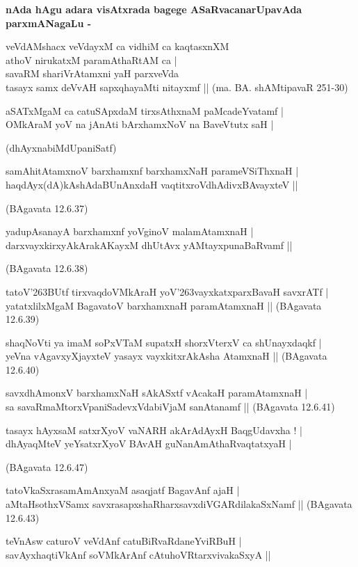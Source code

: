 {\bigskip
\noindent
{\large\bf nAda hAgu adara visAtxrada bagege ASaRvacanarUpavAda parxmANagaLu -}}
\begin{itemize}
{\bf
\item[1.] veVdAMshacx veVdayxM ca vidhiM ca kaqtasxnXM\\\label{144}
athoV nirukatxM paramAthaRtAM ca |\\
savaRM shariVrAtamxni yaH parxveVda\\
tasayx samx deVvAH sapxqhayaMti nitayxmf ||
\hfill{(ma. BA. shAMtipavaR 251-30)}
\item[2.] aSATxMgaM ca catuSApxdaM tirxsAthxnaM paMcadeYvatamf |\\\label{144}
OMkAraM yoV na jAnAti bArxhamxNoV na BaveVtutx saH |

\hfill{(dhAyxnabiMdUpaniSatf)}
\item[3.] samAhitAtamxnoV barxhamxnf barxhamxNaH parameVSiThxnaH |\\\label{144}
haqdAyx(dA)kAshAdaBUnAnxdaH vaqtitxroVdhAdivxBAvayxteV ||

\hfill{(BAgavata 12.6.37)}}

{\bf
\item[4.] yadupAsanayA barxhamxnf yoVginoV malamAtamxnaH |\\
darxvayxkirxyAkArakAKayxM dhUtAvx yAMtayxpunaBaRvamf ||

\hfill{(BAgavata 12.6.38)}
\item[5.] tatoV\char'263BUtf tirxvaqdoVMkAraH yoV\char'263vayxkatxparxBavaH savxrATf |\\
yatatxlilxMgaM BagavatoV barxhamxnaH paramAtamxnaH ||
\hfill{(BAgavata 12.6.39)}
\item[6.] shaqNoVti ya imaM soPxVTaM supatxH shorxVterxV ca shUnayxdaqkf |\\
yeVna vAgavxyXjayxteV yasayx vayxkitxrAkAsha AtamxnaH ||
\hfill{(BAgavata 12.6.40)}
\item[7.] savxdhAmonxV barxhamxNaH sAkASxtf vAcakaH paramAtamxnaH |\\
sa savaRmaMtorxVpaniSadevxVdabiVjaM sanAtanamf ||
\hfill{(BAgavata 12.6.41)}
\item[8.] tasayx hAyxsaM satxrXyoV vaNARH akArAdAyxH BaqgUdavxha ! |\\
dhAyaqMteV yeYsatxrXyoV BAvAH guNanAmAthaRvaqtatxyaH |

\hfill{(BAgavata 12.6.47)}
\item[9.] tatoVkaSxrasamAmAnxyaM asaqjatf BagavAnf ajaH |\\
aMtaHsothxVSamx savxrasapxshaRharxsavxdiVGARdilakaSxNamf ||
\hfill{(BAgavata 12.6.43)}
\item[10.] teVnAsw caturoV veVdAnf catuBiRvaRdaneYviRBuH |\\
savAyxhaqtiVkAnf soVMkArAnf cAtuhoVRtarxvivakaSxyA ||

}
\end{itemize}

